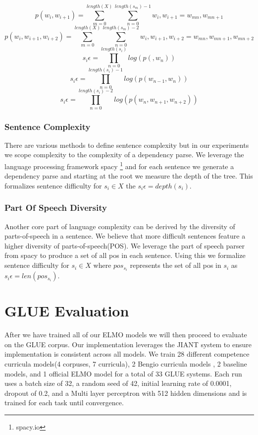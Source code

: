 \begin{equation}
    p(w_{i}, w_{i+1}) = \sum_{m=0} ^ {length(X)} \sum_{n=0}^{length(s_m)-1} w_i, w_{i+1} = w_{mn},w_{mn+1}
\label{equation:bigramprob}
\end{equation}
\begin{equation}
    p(w_{i}, w_{i+1}, w_{i+2}) = \sum_{m=0} ^ {length(X)} \sum_{n=0}^{length(s_m)-2} w_i, w_{i+1},w_{i+2} = w_{mn},w_{mn+1},w_{mn+2}
\label{equation:trigramprob}
\end{equation}
\begin{equation}
   s_i\epsilon = \prod_{n=0}^{length(s_i)} log(p(, w_n))
\label{equation:unigramdifficulty}
\end{equation}
\begin{equation}
        s_i\epsilon = \prod_{n=0}^{length(s_i)-1} log(p(w_{n-1}, w_n))
\label{equation:bigramdifficulty}
\end{equation}
\begin{equation}
    s_i\epsilon = \prod_{n=0}^{length(s_i)-2} log(p(w_{n}, w_{n+1}, w_{n+2}))
\label{equation:trigramdifficulty}
\end{equation}
\subsubsection{Sentence Complexity}
There are various methods to define sentence complexity but in our experiments we scope complexity to the complexity of a dependency parse. We leverage the language processing framework spacy \footnote{spacy.io} and for each sentence we generate a dependency parse and starting at the root we measure the depth of the tree. This formalizes sentence difficulty for  $s_i \in X$ the  $s_i\epsilon = depth(s_i)$.
\subsubsection{Part Of Speech Diversity}
Another core part of language complexity can be derived by the diversity of parts-of-speech in a sentence. We believe that more difficult sentences feature a higher diversity of parts-of-speech(POS). We leverage the part of speech parser from spacy to produce a set of all pos in each sentence. Using this we formalize sentence difficulty for $s_i \in X$  where $pos_{s_i}$ represents the set of all pos in $s_i$ as $s_i \epsilon = len(pos_{s_i})$.
\section{GLUE Evaluation}
After we have trained all of our ELMO models we will then proceed to evaluate on the GLUE corpus. Our implementation leverages the JIANT system to ensure implementation is consistent across all models. We train 28 different competence curricula models(4 corpuses, 7 curricula), 2 Bengio curricula models , 2 baseline models, and 1 official ELMO model for a total of 33 GLUE systems. Each run uses a batch size of 32, a random seed of 42, initial learning rate of 0.0001, dropout of 0.2, and a Multi layer perceptron with 512 hidden dimensions and is trained for each task until convergence.